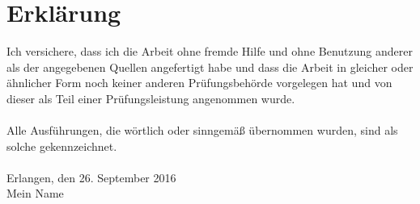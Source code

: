 
\chapter*{Erklärung}
\label{sec:Erklärung}
Ich versichere, dass ich die Arbeit ohne fremde Hilfe und ohne Benutzung anderer als der angegebenen Quellen angefertigt habe und dass die Arbeit in gleicher oder ähnlicher Form noch keiner anderen Prüfungsbehörde vorgelegen hat und von dieser als Teil einer Prüfungsleistung angenommen wurde. \\
\\
Alle Ausführungen, die wörtlich oder sinngemäß übernommen wurden, sind als solche gekennzeichnet. \\
\vspace{1.0cm}
\\
Erlangen, den 26. September 2016
\vspace{2.5cm}
\\
Mein Name

